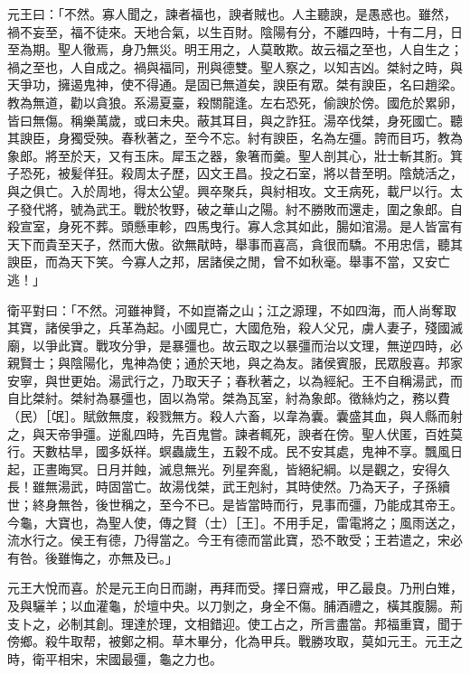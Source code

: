 \begin{pinyinscope}
元王曰：「不然。寡人聞之，諫者福也，諛者賊也。人主聽諛，是愚惑也。雖然，禍不妄至，福不徒來。天地合氣，以生百財。陰陽有分，不離四時，十有二月，日至為期。聖人徹焉，身乃無災。明王用之，人莫敢欺。故云福之至也，人自生之；禍之至也，人自成之。禍與福同，刑與德雙。聖人察之，以知吉凶。桀紂之時，與天爭功，擁遏鬼神，使不得通。是固已無道矣，諛臣有眾。桀有諛臣，名曰趙梁。教為無道，勸以貪狼。系湯夏臺，殺關龍逢。左右恐死，偷諛於傍。國危於累卵，皆曰無傷。稱樂萬歲，或曰未央。蔽其耳目，與之詐狂。湯卒伐桀，身死國亡。聽其諛臣，身獨受殃。春秋著之，至今不忘。紂有諛臣，名為左彊。誇而目巧，教為象郎。將至於天，又有玉床。犀玉之器，象箸而羹。聖人剖其心，壯士斬其胻。箕子恐死，被髪佯狂。殺周太子歷，囚文王昌。投之石室，將以昔至明。陰兢活之，與之俱亡。入於周地，得太公望。興卒聚兵，與紂相攻。文王病死，載尸以行。太子發代將，號為武王。戰於牧野，破之華山之陽。紂不勝敗而還走，圍之象郎。自殺宣室，身死不葬。頭懸車軫，四馬曳行。寡人念其如此，腸如涫湯。是人皆富有天下而貴至天子，然而大傲。欲無猒時，舉事而喜高，貪很而驕。不用忠信，聽其諛臣，而為天下笑。今寡人之邦，居諸侯之閒，曾不如秋毫。舉事不當，又安亡逃！」

衛平對曰：「不然。河雖神賢，不如崑崙之山；江之源理，不如四海，而人尚奪取其寶，諸侯爭之，兵革為起。小國見亡，大國危殆，殺人父兄，虜人妻子，殘國滅廟，以爭此寶。戰攻分爭，是暴彊也。故云取之以暴彊而治以文理，無逆四時，必親賢士；與陰陽化，鬼神為使；通於天地，與之為友。諸侯賓服，民眾殷喜。邦家安寧，與世更始。湯武行之，乃取天子；春秋著之，以為經紀。王不自稱湯武，而自比桀紂。桀紂為暴彊也，固以為常。桀為瓦室，紂為象郎。徵絲灼之，務以費（民）［氓］。賦斂無度，殺戮無方。殺人六畜，以韋為囊。囊盛其血，與人縣而射之，與天帝爭彊。逆亂四時，先百鬼嘗。諫者輒死，諛者在傍。聖人伏匿，百姓莫行。天數枯旱，國多妖祥。螟蟲歲生，五穀不成。民不安其處，鬼神不享。飄風日起，正晝晦冥。日月并蝕，滅息無光。列星奔亂，皆絕紀綱。以是觀之，安得久長！雖無湯武，時固當亡。故湯伐桀，武王剋紂，其時使然。乃為天子，子孫續世；終身無咎，後世稱之，至今不已。是皆當時而行，見事而彊，乃能成其帝王。今龜，大寶也，為聖人使，傳之賢（士）［王］。不用手足，雷電將之；風雨送之，流水行之。侯王有德，乃得當之。今王有德而當此寶，恐不敢受；王若遣之，宋必有咎。後雖悔之，亦無及已。」

元王大悅而喜。於是元王向日而謝，再拜而受。擇日齋戒，甲乙最良。乃刑白雉，及與驪羊；以血灌龜，於壇中央。以刀剝之，身全不傷。脯酒禮之，橫其腹腸。荊支卜之，必制其創。理達於理，文相錯迎。使工占之，所言盡當。邦福重寶，聞于傍鄉。殺牛取帮，被鄭之桐。草木畢分，化為甲兵。戰勝攻取，莫如元王。元王之時，衛平相宋，宋國最彊，龜之力也。


\end{pinyinscope}
